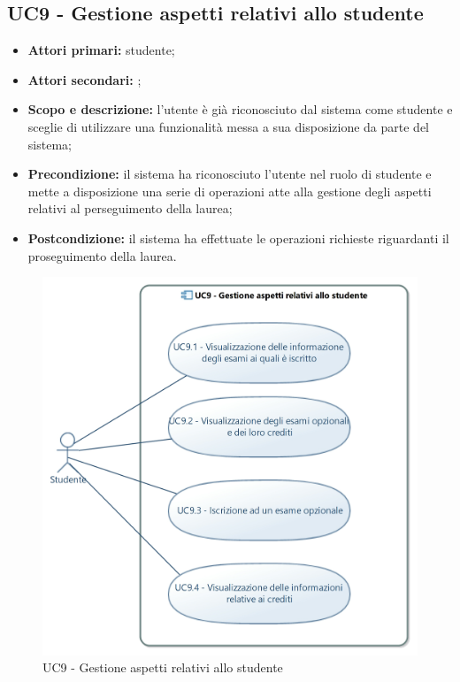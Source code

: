 \documentclass[AnalisiDeiRequisiti.tex]{subfiles}
\begin{document}
\subsection{UC9 - Gestione aspetti relativi allo studente}
\begin{itemize}
	\item \textbf{Attori primari:} studente;
	\item \textbf{Attori secondari:} ;
	\item \textbf{Scopo e descrizione:} l'utente è già riconosciuto dal sistema come studente e sceglie di utilizzare una funzionalità messa a sua disposizione da parte del sistema;
	\item \textbf{Precondizione:} il sistema ha riconosciuto l'utente nel ruolo di studente e mette a disposizione una serie di operazioni atte alla gestione degli aspetti relativi al perseguimento della laurea;
	\item \textbf{Postcondizione:} il sistema ha effettuate le operazioni richieste riguardanti il proseguimento della laurea.
\end{itemize}
\begin{figure}[H]
	\centering
	\includegraphics[width=0.8\linewidth]{UC9.jpg}
	\caption{UC9 - Gestione aspetti relativi allo studente}
	\label{fig:UC9 - Gestione aspetti relativi allo studente} %
\end{figure}
\end{document}
